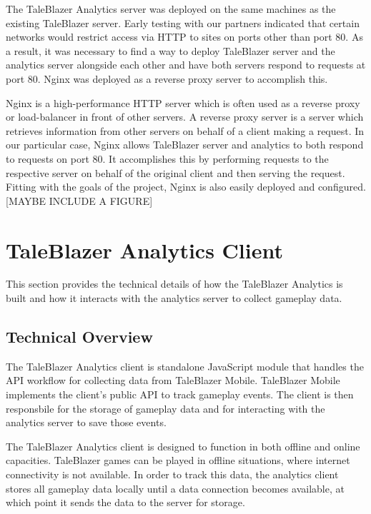 The TaleBlazer Analytics server was deployed on the same machines as the existing TaleBlazer server. Early testing with our partners indicated that certain networks would restrict access via HTTP to sites on ports other than port 80. As a result, it was necessary to find a way to deploy TaleBlazer server and the analytics server alongside each other and have both servers respond to requests at port 80. Nginx was deployed as a reverse proxy server to accomplish this. 

Nginx is a high-performance HTTP server which is often used as a reverse proxy or load-balancer in front of other servers. A reverse proxy server is a server which retrieves information from other servers on behalf of a client making a request. In our particular case, Nginx allows TaleBlazer server and analytics to both respond to requests on port 80. It accomplishes this by performing requests to the respective server on behalf of the original client and then serving the request. Fitting with the goals of the project, Nginx is also easily deployed and configured. [MAYBE INCLUDE A FIGURE]

\section{TaleBlazer Analytics Client}

This section provides the technical details of how the TaleBlazer Analytics is built and how it interacts with the analytics server to collect gameplay data. 

\subsection{Technical Overview}

The TaleBlazer Analytics client is standalone JavaScript module that handles the API workflow for collecting data from TaleBlazer Mobile. TaleBlazer Mobile implements the client's public API to track gameplay events. The client is then responsbile for the storage of gameplay data and for interacting with the analytics server to save those events. 

The TaleBlazer Analytics client is designed to function in both offline and online capacities. TaleBlazer games can be played in offline situations, where internet connectivity is not available. In order to track this data, the analytics client stores all gameplay data locally until a data connection becomes available, at which point it sends the data to the server for storage.

